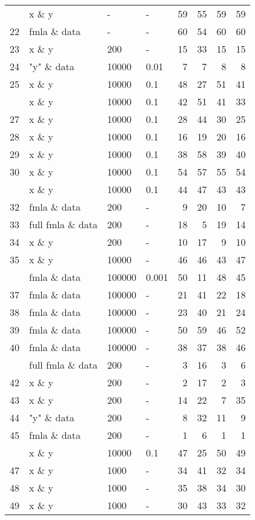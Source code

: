 \begin{Schunk}
\begin{tabular}{rlllrrrr}
\addlinespace
21 & x \& y & - & - & 59 & 55 & 59 & 59\\
22 & fmla \& data & - & - & 60 & 54 & 60 & 60\\
23 & x \& y & 200 & - & 15 & 33 & 15 & 15\\
24 & "y" \& data & 10000 & 0.01 & 7 & 7 & 8 & 8\\
25 & x \& y & 10000 & 0.1 & 48 & 27 & 51 & 41\\
\addlinespace
26 & x \& y & 10000 & 0.1 & 42 & 51 & 41 & 33\\
27 & x \& y & 10000 & 0.1 & 28 & 44 & 30 & 25\\
28 & x \& y & 10000 & 0.1 & 16 & 19 & 20 & 16\\
29 & x \& y & 10000 & 0.1 & 38 & 58 & 39 & 40\\
30 & x \& y & 10000 & 0.1 & 54 & 57 & 55 & 54\\
\addlinespace
31 & x \& y & 10000 & 0.1 & 44 & 47 & 43 & 43\\
32 & fmla \& data & 200 & - & 9 & 20 & 10 & 7\\
33 & full fmla \& data & 200 & - & 18 & 5 & 19 & 14\\
34 & x \& y & 200 & - & 10 & 17 & 9 & 10\\
35 & x \& y & 10000 & - & 46 & 46 & 43 & 47\\
\addlinespace
36 & fmla \& data & 100000 & 0.001 & 50 & 11 & 48 & 45\\
37 & fmla \& data & 100000 & - & 21 & 41 & 22 & 18\\
38 & fmla \& data & 100000 & - & 23 & 40 & 21 & 24\\
39 & fmla \& data & 100000 & - & 50 & 59 & 46 & 52\\
40 & fmla \& data & 100000 & - & 38 & 37 & 38 & 46\\
\addlinespace
41 & full fmla \& data & 200 & - & 3 & 16 & 3 & 6\\
42 & x \& y & 200 & - & 2 & 17 & 2 & 3\\
43 & x \& y & 200 & - & 14 & 22 & 7 & 35\\
44 & "y" \& data & 200 & - & 8 & 32 & 11 & 9\\
45 & fmla \& data & 200 & - & 1 & 6 & 1 & 1\\
\addlinespace
46 & x \& y & 10000 & 0.1 & 47 & 25 & 50 & 49\\
47 & x \& y & 1000 & - & 34 & 41 & 32 & 34\\
48 & x \& y & 1000 & - & 35 & 38 & 34 & 30\\
49 & x \& y & 1000 & - & 30 & 43 & 33 & 32\\

\end{tabular}
\end{Schunk}
